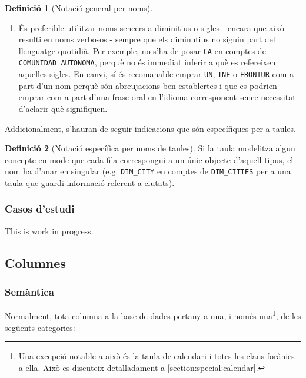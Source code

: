 \documentclass{article}
\theoremstyle{definition}
\newtheorem{definition}{Definició}
\begin{document}
\begin{definition}[Notació general per noms]
\begin{enumerate}
  \item És preferible utilitzar noms sencers a diminitius o sigles - encara que això resulti en noms verbosos - sempre que els diminutius no siguin part del llenguatge quotidià. Per exemple, no s'ha de posar \verb|CA| en comptes de \verb|COMUNIDAD_AUTONOMA|, perquè no és immediat inferir a què es refereixen aquelles sigles. En canvi, sí és recomanable emprar \verb|UN|, \verb|INE| o \verb|FRONTUR| com a part d'un nom perquè són abreujacions ben establertes i que es podrien emprar com a part d'una frase oral en l'idioma corresponent sence necessitat d'aclarir què signifiquen.
\end{enumerate}
\end{definition}

Addicionalment, s'hauran de seguir indicacions que són específiques per a taules.

\begin{definition}[Notació específica per noms de taules]\label{def:tables:notation}
Si la taula modelitza algun concepte en mode que cada fila correspongui a un únic objecte d'aquell tipus, el nom ha d'anar en singular (e.g. \verb|DIM_CITY| en comptes de \verb|DIM_CITIES| per a una taula que guardi informació referent a ciutats).
\end{definition}

\subsubsection{Casos d'estudi}\label{section:nomenclature:tables:examples}
This is work in progress.

\subsection{Columnes}\label{section:nomenclature:columns}
\subsubsection{Semàntica}\label{section:nomenclature:columns:semantics}
Normalment, tota columna a la base de dades pertany a una, i només una\footnote{Una excepció notable a això és la taula de calendari i totes les claus forànies a ella. Això es discuteix detalladament a \cref{section:special:calendar}.}, de les següents categories:
\end{document}
